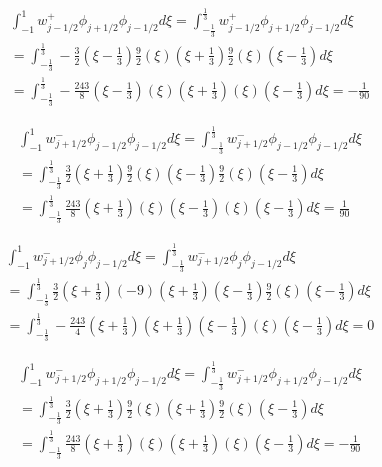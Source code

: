 \documentclass[12pt]{article}
\begin{document}
\begin{multline*}
\int_{-1}^{1}w^+_{j - 1/2}\phi_{j + 1/2}\phi_{j-1/2}d\xi = \int_{-\frac{1}{3}}^{\frac{1}{3}}w^+_{j - 1/2}\phi_{j + 1/2}\phi_{j-1/2}d\xi \\ = \int_{-\frac{1}{3}}^{\frac{1}{3}}-\frac{3}{2}\left(\xi - \frac{1}{3}\right) \frac{9}{2}\left(\xi\right)\left(\xi + \frac{1}{3}\right) \frac{9}{2}\left(\xi\right)\left(\xi - \frac{1}{3}\right)d\xi \\ = \int_{-\frac{1}{3}}^{\frac{1}{3}}-\frac{243}{8}\left(\xi - \frac{1}{3}\right) \left(\xi\right)\left(\xi + \frac{1}{3}\right)\left(\xi\right)\left(\xi - \frac{1}{3}\right)d\xi = -\frac{1}{90}
\end{multline*}

%
\begin{multline*}
\int_{-1}^{1}w^-_{j + 1/2}\phi_{j - 1/2}\phi_{j-1/2}d\xi = \int_{-\frac{1}{3}}^{\frac{1}{3}}w^-_{j + 1/2}\phi_{j - 1/2}\phi_{j-1/2}d\xi \\ = \int_{-\frac{1}{3}}^{\frac{1}{3}}\frac{3}{2}\left(\xi + \frac{1}{3}\right) \frac{9}{2}\left(\xi\right)\left(\xi - \frac{1}{3}\right) \frac{9}{2}\left(\xi\right)\left(\xi - \frac{1}{3}\right)d\xi \\ = \int_{-\frac{1}{3}}^{\frac{1}{3}}\frac{243}{8}\left(\xi + \frac{1}{3}\right) \left(\xi\right)\left(\xi - \frac{1}{3}\right)\left(\xi\right)\left(\xi - \frac{1}{3}\right)d\xi = \frac{1}{90}
\end{multline*}

\begin{multline*}
\int_{-1}^{1}w^-_{j + 1/2}\phi_{j}\phi_{j-1/2}d\xi = \int_{-\frac{1}{3}}^{\frac{1}{3}}w^-_{j + 1/2}\phi_{j}\phi_{j-1/2}d\xi \\ = \int_{-\frac{1}{3}}^{\frac{1}{3}}\frac{3}{2}\left(\xi + \frac{1}{3}\right) (-9)\left(\xi + \frac{1}{3}\right)\left(\xi - \frac{1}{3}\right) \frac{9}{2}\left(\xi\right)\left(\xi - \frac{1}{3}\right)d\xi \\ = \int_{-\frac{1}{3}}^{\frac{1}{3}}-\frac{243}{4}\left(\xi + \frac{1}{3}\right) \left(\xi + \frac{1}{3}\right)\left(\xi - \frac{1}{3}\right)\left(\xi\right)\left(\xi - \frac{1}{3}\right)d\xi = 0
\end{multline*}

\begin{multline*}
\int_{-1}^{1}w^-_{j + 1/2}\phi_{j + 1/2}\phi_{j-1/2}d\xi = \int_{-\frac{1}{3}}^{\frac{1}{3}}w^-_{j + 1/2}\phi_{j + 1/2}\phi_{j-1/2}d\xi \\ = \int_{-\frac{1}{3}}^{\frac{1}{3}}\frac{3}{2}\left(\xi + \frac{1}{3}\right) \frac{9}{2}\left(\xi\right)\left(\xi + \frac{1}{3}\right) \frac{9}{2}\left(\xi\right)\left(\xi - \frac{1}{3}\right)d\xi \\ = \int_{-\frac{1}{3}}^{\frac{1}{3}}\frac{243}{8}\left(\xi + \frac{1}{3}\right) \left(\xi\right)\left(\xi + \frac{1}{3}\right)\left(\xi\right)\left(\xi - \frac{1}{3}\right)d\xi = -\frac{1}{90}
\end{multline*}
\end{document}
